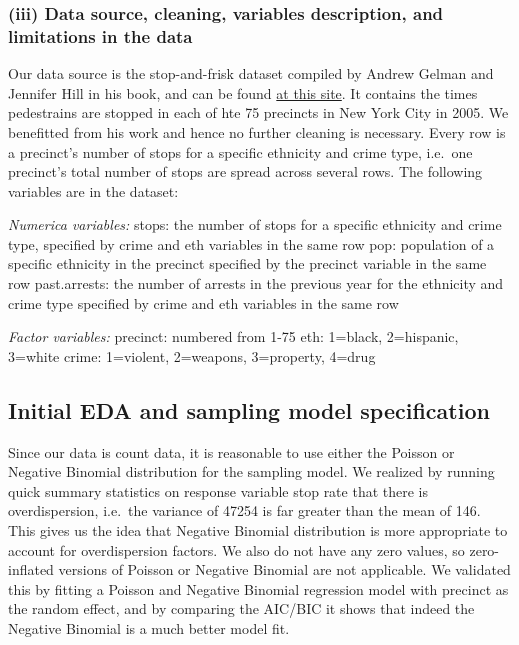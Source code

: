\documentclass[]{article}
\begin{document}
\hypertarget{iii-data-source-cleaning-variables-description-and-limitations-in-the-data}{%
\subsubsection{(iii) Data source, cleaning, variables description, and
limitations in the
data}\label{iii-data-source-cleaning-variables-description-and-limitations-in-the-data}}

Our data source is the stop-and-frisk dataset compiled by Andrew Gelman
and Jennifer Hill in his book, and can be found
\href{http://www.stat.columbia.edu/~gelman/arm/examples/police/frisk_with_noise.dat}{at
this site}. It contains the times pedestrains are stopped in each of hte
75 precincts in New York City in 2005. We benefitted from his work and
hence no further cleaning is necessary. Every row is a precinct's number
of stops for a specific ethnicity and crime type, i.e.~one precinct's
total number of stops are spread across several rows. The following
variables are in the dataset:

\emph{Numerica variables:} stops: the number of stops for a specific
ethnicity and crime type, specified by crime and eth variables in the
same row pop: population of a specific ethnicity in the precinct
specified by the precinct variable in the same row past.arrests: the
number of arrests in the previous year for the ethnicity and crime type
specified by crime and eth variables in the same row

\emph{Factor variables:} precinct: numbered from 1-75 eth: 1=black,
2=hispanic, 3=white crime: 1=violent, 2=weapons, 3=property, 4=drug

\hypertarget{initial-eda-and-sampling-model-specification}{%
\subsection{Initial EDA and sampling model
specification}\label{initial-eda-and-sampling-model-specification}}

Since our data is count data, it is reasonable to use either the Poisson
or Negative Binomial distribution for the sampling model. We realized by
running quick summary statistics on response variable stop rate that
there is overdispersion, i.e.~the variance of 47254 is far greater than
the mean of 146. This gives us the idea that Negative Binomial
distribution is more appropriate to account for overdispersion factors.
We also do not have any zero values, so zero-inflated versions of
Poisson or Negative Binomial are not applicable. We validated this by
fitting a Poisson and Negative Binomial regression model with precinct
as the random effect, and by comparing the AIC/BIC it shows that indeed
the Negative Binomial is a much better model fit.
\end{document}
